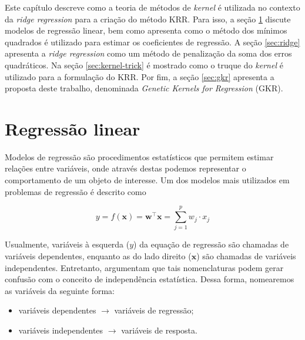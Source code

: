 Este capítulo descreve como a teoria de métodos de \textit{kernel} é utilizada no contexto da \textit{\textit{ridge regression}} para a criação do método KRR. Para isso, a seção \ref{sec:linreg} discute modelos de regressão linear, bem como apresenta como o método dos mínimos quadrados é utilizado para estimar %
os coeficientes de regressão. A seção \ref{sec:ridge} apresenta a \textit{ridge regression} como um método de penalização da soma dos erros quadráticos. Na seção \ref{sec:kernel-trick} é mostrado como o truque do \textit{kernel} é utilizado para a formulação do KRR. Por fim, a seção \ref{sec:gkr} apresenta a proposta deste trabalho, denominada \textit{Genetic Kernels for Regression} (GKR).

\section{Regressão linear} \label{sec:linreg}
Modelos de regressão são procedimentos estatísticos que permitem estimar relações entre variáveis, onde através destas podemos representar o comportamento de um objeto de interesse. Um dos modelos mais utilizados em problemas de regressão é descrito como

\begin{equation}
    \label{ch2:eq1}
    y = f(\mathbf{x}) = \mathbf{w}^{\top}\mathbf{x} = \sum_{j=1}^{p}{w_j \cdot x_j}
\end{equation}

Usualmente, variáveis à esquerda ($y$) da equação de regressão são chamadas de variáveis dependentes, enquanto as do lado direito ($\mathbf{x}$) são chamadas de variáveis independentes. Entretanto,  argumentam que tais nomenclaturas podem gerar confusão com o conceito de independência estatística. Dessa forma, nomearemos as variáveis da seguinte forma:

\begin{itemize}
    \item variáveis dependentes $\rightarrow$ variáveis de regressão;%
    \item variáveis independentes $\rightarrow$ variáveis de resposta.
\end{itemize}

